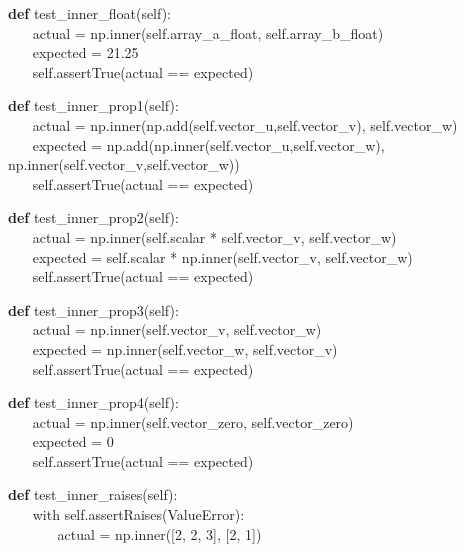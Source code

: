 \documentclass[a4paper,11pt]{article}
\begin{document}
\begin{algorithm}[H]
\textbf{def} test\_inner\_float(self):
\\ $ ~~~~~~~~ $actual = np.inner(self.array\_a\_float, self.array\_b\_float)
\\ $ ~~~~~~~~ $expected = 21.25
\\ $ ~~~~~~~~ $self.assertTrue(actual == expected)
\end{algorithm}

\begin{algorithm}[H]
\textbf{def} test\_inner\_prop1(self): 
\\ $ ~~~~~~~~ $actual = np.inner(np.add(self.vector\_u,self.vector\_v), self.vector\_w)
\\ $ ~~~~~~~~ $expected = np.add(np.inner(self.vector\_u,self.vector\_w), np.inner(self.vector\_v,self.vector\_w))
\\ $ ~~~~~~~~ $self.assertTrue(actual == expected)
\end{algorithm}

\begin{algorithm}[H]
\textbf{def} test\_inner\_prop2(self):
\\ $ ~~~~~~~~ $actual = np.inner(self.scalar * self.vector\_v, self.vector\_w)
\\ $ ~~~~~~~~ $expected = self.scalar * np.inner(self.vector\_v, self.vector\_w)
\\ $ ~~~~~~~~ $self.assertTrue(actual == expected)
\end{algorithm}

\begin{algorithm}[H]
\textbf{def} test\_inner\_prop3(self):
\\ $ ~~~~~~~~ $actual = np.inner(self.vector\_v, self.vector\_w)
\\ $ ~~~~~~~~ $expected = np.inner(self.vector\_w, self.vector\_v)
\\ $ ~~~~~~~~ $self.assertTrue(actual == expected)
\end{algorithm}

\begin{algorithm}[H]
\textbf{def} test\_inner\_prop4(self):
\\ $ ~~~~~~~~ $actual = np.inner(self.vector\_zero, self.vector\_zero)
\\ $ ~~~~~~~~ $expected = 0
\\ $ ~~~~~~~~ $self.assertTrue(actual == expected)
\end{algorithm}

\begin{algorithm}[H]
\textbf{def} test\_inner\_raises(self):
\\ $ ~~~~~~~~ $with self.assertRaises(ValueError):
\\ $ ~~~~~~~~~~~~~~~~ $actual = np.inner([2, 2, 3], [2, 1])
\end{algorithm}
\end{document}
